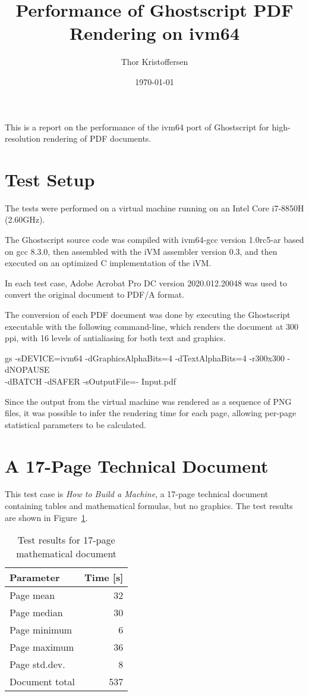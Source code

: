 \documentclass[a4paper,11pt]{article}
\author{Thor Kristoffersen}
\date{\today}
\title{Performance of Ghostscript PDF Rendering on ivm64}
\begin{document}
\maketitle

\noindent
This is a report on the performance of the ivm64 port of Ghostscript for high-resolution rendering of PDF documents.

\section{Test Setup}
\label{sec:test setup}

The tests were performed on a virtual machine running on an Intel Core i7-8850H (2.60GHz).

The Ghostscript source code was compiled with ivm64-gcc version 1.0rc5-ar based on gcc 8.3.0, then assembled with the iVM assembler version 0.3, and then executed on an optimized C implementation of the iVM.

In each test case, Adobe Acrobat Pro DC version 2020.012.20048 was used to convert the original document to PDF/A format.

The conversion of each PDF document was done by executing the Ghostscript executable with the following command-line, which renders the document at 300 ppi, with 16 levels of antialiasing for both text and graphics.
\begin{trivlist}\ttfamily
\item gs -sDEVICE=ivm64 -dGraphicsAlphaBits=4 -dTextAlphaBits=4 -r300x300 -dNOPAUSE \\ -dBATCH -dSAFER -sOutputFile=- Input.pdf
\end{trivlist}


Since the output from the virtual machine was rendered as a sequence of PNG files, it was possible to infer the rendering time for each page, allowing per-page statistical parameters to be calculated.

\section{A 17-Page Technical Document}

This test case is \emph{How to Build a Machine}, a 17-page technical document containing tables and mathematical formulas, but no graphics.
The test results are shown in Figure~\ref{tab:17-page-doc}.

\begin{table}[htbp]
  \centering\small
  \begin{tabular}{@{}lr@{}}
    \hline
    Parameter      & Time [s] \\
    \hline
    Page mean      & 32  \\
    Page median    & 30  \\
    Page minimum   & 6   \\
    Page maximum   & 36  \\
    Page std.dev.  & 8   \\
    Document total & 537 \\
    \hline
  \end{tabular}
  \caption{Test results for 17-page mathematical document}
  \label{tab:17-page-doc}
\end{table}
\end{document}
